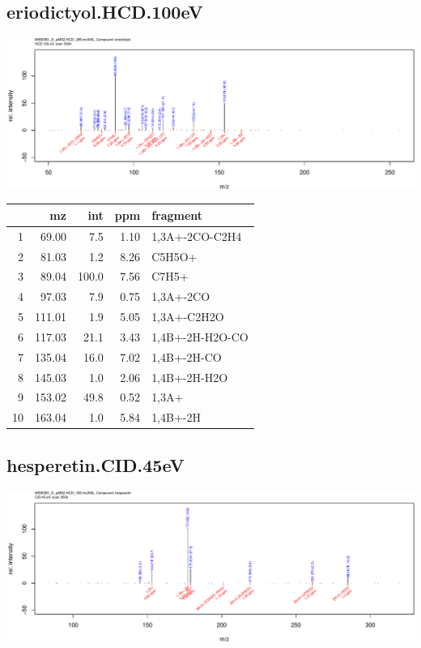 \documentclass[]{article}
\begin{document}
\clearpage\subsection{eriodictyol.HCD.100eV}
\includegraphics[width=\textwidth]{WEB350_files/figure-latex/unnamed-chunk-3-6}

\begin{table}[ht]
\centering
\begin{tabular}{rrrrl}
  \toprule
 & mz & int & ppm & fragment \\ 
  \midrule
1 & 69.00 & 7.5 & 1.10 & 1,3A+-2CO-C2H4 \\ 
  2 & 81.03 & 1.2 & 8.26 & C5H5O+ \\ 
  3 & 89.04 & 100.0 & 7.56 & C7H5+ \\ 
  4 & 97.03 & 7.9 & 0.75 & 1,3A+-2CO \\ 
  5 & 111.01 & 1.9 & 5.05 & 1,3A+-C2H2O \\ 
  6 & 117.03 & 21.1 & 3.43 & 1,4B+-2H-H2O-CO \\ 
  7 & 135.04 & 16.0 & 7.02 & 1,4B+-2H-CO \\ 
  8 & 145.03 & 1.0 & 2.06 & 1,4B+-2H-H2O \\ 
  9 & 153.02 & 49.8 & 0.52 & 1,3A+ \\ 
  10 & 163.04 & 1.0 & 5.84 & 1,4B+-2H \\ 
   \bottomrule
\end{tabular}
\end{table}

\clearpage\subsection{hesperetin.CID.45eV}
\includegraphics[width=\textwidth]{WEB350_files/figure-latex/unnamed-chunk-3-7}
\end{document}
